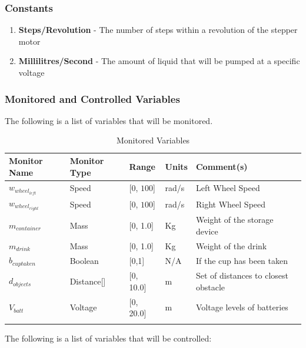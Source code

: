 \documentclass [11pt]{article}
\begin{document}
\subsubsection{Constants}
\begin{enumerate}
	\itemsep0pt
	\item \textbf{Steps/Revolution} -  The number of steps within a revolution of the stepper motor
	\item \textbf{Millilitres/Second} - The amount of liquid that will be pumped at a specific voltage
\end{enumerate}


\subsubsection{Monitored and Controlled Variables}

The following is a list of variables that will be monitored.

\begin{longtable}{|l|l|l|l|l|}\hline 
	\rowcolor{tableCell}\textbf{Monitor Name} & \textbf{Monitor Type} & \textbf{Range} & \textbf{Units} & \textbf{Comment(s)} \\ \hline
	$ w_{wheel_{left}} $ & Speed & [0, $ 100 $]& rad/s &  Left Wheel Speed\\ \hline
	\rowcolor{tableCell}$ w_{wheel_{right}} $ & Speed & [0, $ 100 $]& rad/s & Right Wheel Speed \\ \hline
	$ m_{container} $ & Mass & [0, 1.0]& Kg &  Weight of the storage device  \\ \hline
	\rowcolor{tableCell}$ m_{drink} $    & Mass & [0, 1.0] & Kg &  Weight of the drink  \\ \hline
	$ b_{cuptaken } $ & Boolean & [0,1] & N/A & If the cup has been taken \\ \hline
	\rowcolor{tableCell}$  d_{objects} $ & Distance[] & [0, 10.0]& m & Set of distances to closest obstacle \\ \hline
	$  V_{batt} $ & Voltage & [0, 20.0]& m &  Voltage levels of batteries \\ \hline
	\caption{Monitored Variables}
\end{longtable}




The following is a list of variables that will be controlled:
\end{document}
